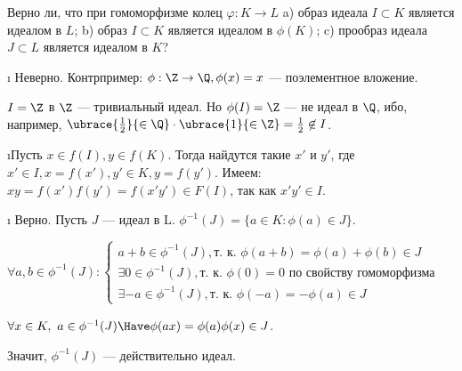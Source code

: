 \begin{problem}[18(4.1)]
Верно ли, что при гомоморфизме колец $\varphi: K \to L$ 
a) образ идеала $I \subset K$ является идеалом в $L$; b) образ $I \subset K$ является идеалом в $\phi(K)$; c) прообраз идеала $J \subset L$ является идеалом в $K$?
\end{problem}
\begin{solution}
\begin{enumerate}
\def\labelenumi{\alph{enumi})}
\i
  Неверно. Контрпример: \(\phi:\Z \to \Q, \phi(x)=x\) --- поэлементное вложение.

  \(I=\Z\) в \(\Z\) --- тривиальный идеал. Но \(\phi(I)=\Z\) --- не идеал в \(\Q\), ибо, например, \(\ubrace{\frac{1}{2}}{\in \Q} \cdot \ubrace{1}{\in \Z} = \frac{1}{2} \not\in I\).
  
\i Пусть $x \in f(I), y \in f(K)$. Тогда найдутся такие $x'$ и $y'$, где $x' \in I, x = f(x'), y' \in K, y = f(y')$.
    Имеем: $xy = f(x')f(y') = f (x' y') \in F(I)$, так как $x' y' \in I$.
    
\i
  Верно. Пусть \(J\) --- идеал в L. \(\phi^{-1}(J) = \{a \in K : \phi(a) \in J\}\).

  \(\forall a, b \in \phi^{-1}(J): 
	\begin{cases} 
		a+b \in \phi^{-1}(J), \text{т. к. } \phi(a+b) = \phi(a)+\phi(b) \in J \\
		\exists 0 \in \phi^{-1}(J), \text{т. к. } \phi(0)=0 \text{ по свойству гомоморфизма}\\
		\exists -a \in \phi^{-1}(J), \text{т. к. }\phi(-a) = -\phi(a) \in J 
	\end{cases}\)

  \(\forall x \in K,\ a \in \phi^{-1}(J) \Have \phi(ax)=\phi(a)\phi(x) \in J\).

  Значит, \(\phi^{-1}(J)\) --- действительно идеал.
\end{enumerate}
\end{solution}

\begin{problem}[19(4.2)]
\end{problem}

